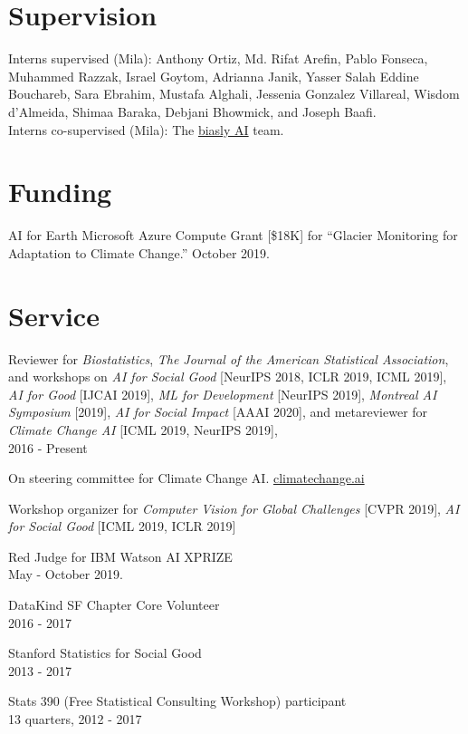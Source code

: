\documentclass[letterpaper]{article}
\renewenvironment{itemize}{
  \begin{list}{}{
    \setlength{\leftmargin}{1.5em}
  }
}{
  \end{list}
}
\begin{document}
\section*{Supervision}
Interns supervised (Mila): Anthony Ortiz, Md. Rifat Arefin, Pablo Fonseca, Muhammed Razzak, Israel Goytom, Adrianna Janik, Yasser Salah Eddine Bouchareb, Sara Ebrahim, Mustafa Alghali, Jessenia Gonzalez Villareal, Wisdom d'Almeida, Shimaa Baraka, Debjani Bhowmick, and Joseph Baafi. \\
Interns co-supervised (Mila): The \href{https://sites.google.com/view/biaslyai/home}{biasly AI} team.

\section*{Funding}
AI for Earth Microsoft Azure Compute Grant [\$18K] for
``Glacier Monitoring for Adaptation to Climate Change.'' October 2019.

\section*{Service}

\begin{itemize}
\item Reviewer for \textit{Biostatistics}, \textit{The Journal of the American Statistical Association}, and workshops on \textit{AI for Social Good} [NeurIPS 2018, ICLR 2019, ICML 2019], \textit{AI for Good} [IJCAI 2019], \textit{ML for Development} [NeurIPS 2019], \textit{Montreal AI Symposium} [2019], \textit{AI for Social Impact} [AAAI 2020], and metareviewer for \textit{Climate Change AI} [ICML 2019, NeurIPS 2019],\\
  2016 - Present
\item  On steering committee for Climate Change AI. \href{https://climatechange.ai}{climatechange.ai}
\item Workshop organizer for \textit{Computer Vision for Global Challenges} [CVPR 2019], \textit{AI for Social Good} [ICML 2019, ICLR 2019]
\item Red Judge for IBM Watson AI XPRIZE \\
May - October 2019.
\item DataKind SF Chapter Core Volunteer \\
  2016 - 2017
\item Stanford Statistics for Social Good \\
  2013 - 2017
\item Stats 390 (Free Statistical Consulting Workshop) participant \\
  13 quarters, 2012 - 2017
\end{itemize}
\end{document}
